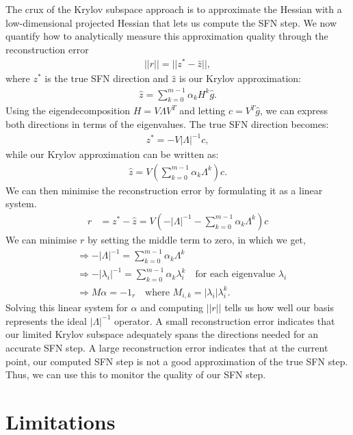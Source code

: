 The crux of the Krylov subspace approach is to approximate the Hessian with a low-dimensional projected Hessian that lets us compute the SFN step. We now quantify how to analytically measure this approximation quality through the reconstruction error
\begin{align}
    ||r|| = ||z^* - \hat{z}||,
\end{align}
where $z^*$ is the true SFN direction and $\hat{z}$ is our Krylov approximation:
\begin{align}
    \hat{z} = \sum_{k=0}^{m-1} \alpha_k H^k \hat{g}.
\end{align}
Using the eigendecomposition $H = V \Lambda V^T$ and letting $c = V^T \hat{g}$, we can express both directions in terms of the eigenvalues. The true SFN direction becomes:
\begin{align}
    z^* = -V |\Lambda|^{-1} c,
\end{align}
while our Krylov approximation can be written as:
\begin{align}
    \hat{z} = V \left(\sum_{k=0}^{m-1} \alpha_k \Lambda^k\right) c.
\end{align}
We can then minimise the reconstruction error by formulating it as a linear system.
\begin{align}
    r &= z^* - \hat{z} = V(-|\Lambda|^{-1} - \sum_{k=0}^{m-1} \alpha_k \Lambda^k)c
\end{align}
We can minimise $r$ by setting the middle term to zero, in which we get,
\begin{align}
    &\Rightarrow -|\Lambda|^{-1} = \sum_{k=0}^{m-1} \alpha_k \Lambda^k \\
    &\Rightarrow -|\lambda_i|^{-1} = \sum_{k=0}^{m-1} \alpha_k \lambda_i^k \quad \text{for each eigenvalue } \lambda_i \\
    &\Rightarrow M\alpha = -1_r \quad \text{where } M_{i,k} = |\lambda_i| \lambda_i^k.
\end{align}
Solving this linear system for $\alpha$ and computing $||r||$ tells us how well our basis represents the ideal $|\Lambda|^{-1}$ operator. A small reconstruction error indicates that our limited Krylov subspace adequately spans the directions needed for an accurate SFN step. A large reconstruction error indicates that at the current point, our computed SFN step is not a good approximation of the true SFN step. Thus, we can use this to monitor the quality of our SFN step.

\section{Limitations}
\label{sec:limitations}

